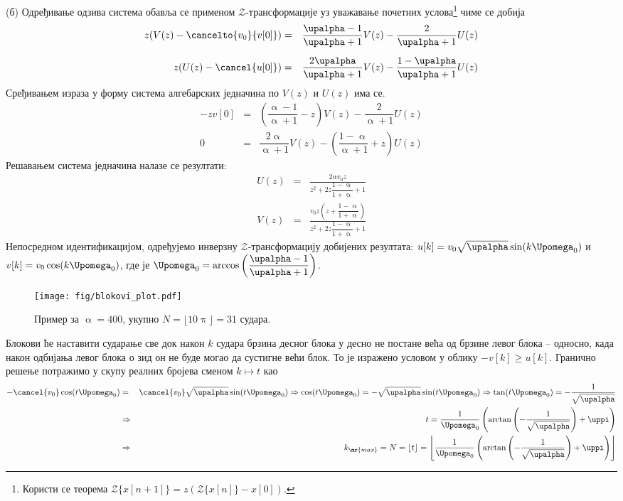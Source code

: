 
(б) Одређивање одзива система обавља се применом $\mathcal{Z}$-трансформације уз уважавање почетних 
услова\footnote{Користи се теорема $\mathcal Z\{x[n + 1]\} = z(\mathcal Z \{x[n]\} - x[0])$. }
чиме се добија
\begin{eqnarray}
    z(V(z) - 
    \cancelto{v_0}{v[0]}
    ) & = & \dfrac{\upalpha - 1}{\upalpha + 1} V(z) - \dfrac{2}{\upalpha + 1} U(z) \\[2mm]
    z(U(z) - \cancel{u[0]} ) & = & \dfrac{2\upalpha}{\upalpha + 1} V(z) - \dfrac{1 - \upalpha}{\upalpha + 1} U(z)
\end{eqnarray}
Сређивањем израза у форму система алгебарских једначина по $V(z)$ и $U(z)$ има се.
\begin{eqnarray}
    - z v[0] & = & \left( \dfrac{\upalpha - 1}{\upalpha + 1} - z \right) V(z) - \dfrac{2}{\upalpha + 1} U(z) \\[2mm]
    0 & = & \dfrac{2\upalpha}{\upalpha + 1} V(z) - \left( \dfrac{1 - \upalpha}{\upalpha + 1} + z \right) 
    U(z)
\end{eqnarray}
Решавањем система једначина налазе се резултати: 
\begin{eqnarray}
    U(z) & = & 
    \frac{2 \alpha v_{0} z}
    {z^{2} + 2 z \dfrac{1 - \upalpha}{1 + \upalpha} + 1}
    \\[2mm]
    V(z) & = & 
    \frac{v_{0} z \left(z + \dfrac{1 - \upalpha}{1 + \upalpha} \right) }
    {z^{2} + 2 z \dfrac{1 - \upalpha}{1 + \upalpha} + 1}
\end{eqnarray}
Непосредном идентификацијом, одређујемо инверзну $\mathcal{Z}$-трансформацију добијених резултата: 
$u[k] = v_0\sqrt\upalpha \sin(k\Upomega_0)$ и 
$v[k] = v_0\cos(k\Upomega_0)$, где је $\Upomega_0 = \arccos\left( \dfrac{\upalpha-1}{\upalpha+1} \right)$.

\begin{figure}[b!]
    \centering
    \texttt{[image: fig/blokovi\_plot.pdf]}
    \caption{Пример за $\upalpha = 400$, укупно $N = \lfloor 10\uppi \rfloor = 31$ судара.}
    \label{fig:\ID.primer}
\end{figure}

Блокови ће наставити сударање све док након $k$ судара брзина десног блока у десно не постане
већа од брзине левог блока -- односно, када након одбијања левог блока о зид он не буде могао да 
сустигне већи блок. То је изражено условом у облику $- v[k] \geq u[k]$.  Гранично решење потражимо
у скупу реалних бројева сменом $k \mapsto t$ као
\begin{eqnarray}
    - \cancel{v_0} \cos(t\Upomega_0) & = & \cancel{v_0} \sqrt{\upalpha} \sin(t\Upomega_0)
    \Rightarrow
    \cos(t\Upomega_0) = -\sqrt{\upalpha} \sin(t\Upomega_0) \Rightarrow 
    \tan(t\Upomega_0) = -\dfrac{1}{\sqrt{\upalpha}}
    \\
    & \Rightarrow & t = \dfrac{1}{\Upomega_0} 
    \left( \arctan\left(-\dfrac1{\sqrt{\upalpha}} \right) + \uppi \right)
    \\
    & \Rightarrow & k_\mr{max} = N = \lfloor t \rfloor = \left\lfloor \dfrac{1}{\Upomega_0} \left( \arctan\left(
        -\dfrac1{\sqrt{\upalpha}} \right) + \uppi \right) \right\rfloor
        \label{eq:\ID.collisions}
\end{eqnarray}

